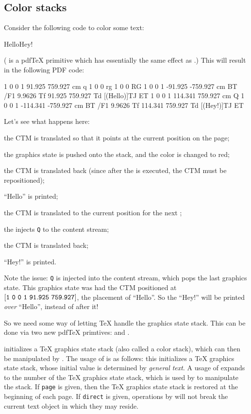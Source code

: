\subsection{Color stacks}

Consider the following code to color some text:

\blisting
\quitvmode{}HelloHey!
\elisting

(\macro\quitvmode{} is a pdf\TeX{} primitive which has essentially the same effect as \macro\leavevmode.)
This will result in the following PDF code:

\blisting {}
1 0 0 1 91.925 759.927 cm
q 1 0 0 rg 1 0 0 RG
1 0 0 1 -91.925 -759.927 cm
BT
/F1 9.9626 Tf 91.925 759.927 Td [(Hello)]TJ
ET
1 0 0 1 114.341 759.927 cm
Q
1 0 0 1 -114.341 -759.927 cm
BT
/F1 9.9626 Tf 114.341 759.927 Td [(Hey!)]TJ
ET
\elisting

Let's see what happens here:
\benum
    \item the CTM is translated so that it points at the current position on the page;
    \item the graphics state is pushed onto the stack, and the color is changed to red;
    \item the CTM is translated back (since after the \macro\pdfliteral{} is executed, the CTM must be
    repositioned);
    \item ``Hello'' is printed;
    \item the CTM is translated to the current position for the next \macro\pdfliteral;
    \item the \macro\pdfliteral{} injects {\tt Q} to the content stream;
    \item the CTM is translated back;
    \item ``Hey!'' is printed.
\eenum

Note the issue: {\tt Q} is injected into the content stream, which pops the last graphics state.
This graphics state was had the CTM positioned at $[{\tt1\ 0\ 0\ 1\ 91.925\ 759.927}]$, the placement of
``Hello''.
So the ``Hey!'' will be printed {\it over} ``Hello'', instead of after it!

So we need some way of letting \TeX{} handle the graphics state stack.
This can be done via two new pdf\TeX{} primtives: \macro\pdfcolorstackinit{} and \macro\pdfcolorstack.

\macro\pdfcolorstackinit{} initializes a \TeX{} graphics state stack (also called a color stack), which can
then be manipulated by \macro\pdfcolorstack.
The usage of \macro\pdfcolorstackinit{} is as follows:
\noindent this initializes a \TeX{} graphics state stack, whose initial value is determined by {\it general
text}.
A usage of \macro\pdfcolorstackinit{} expands to the number of the \TeX{} graphics state stack, which is used
by \macro\pdfcolorstack{} to manipulate the stack.
If {\tt page} is given, then the \TeX{} graphics state stack is restored at the beginning of each page.
If {\tt direct} is given, operations by \macro\pdfcolorstack{} will not break the current text object in which
they may reside.

